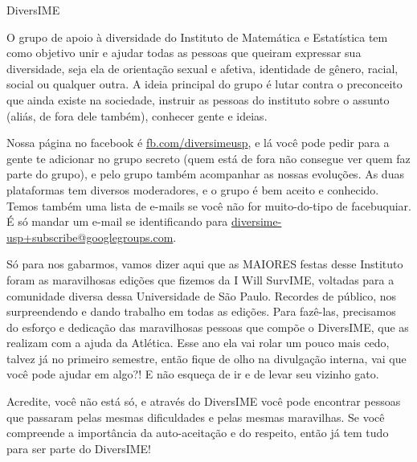 \begin{subsecao}{DiversIME}

O grupo de apoio à diversidade do Instituto de Matemática e Estatística tem como 
objetivo unir e ajudar todas as pessoas que queiram expressar sua diversidade, 
seja ela de orientação sexual e afetiva, identidade de gênero, racial, social ou 
qualquer outra. A ideia principal do grupo é lutar contra o preconceito que ainda 
existe na sociedade, instruir as pessoas do instituto sobre o assunto (aliás, 
de fora dele também), conhecer gente e ideias. 

Nossa página no facebook é \url{fb.com/diversimeusp}, e lá você pode pedir para 
a gente te adicionar no grupo secreto (quem está de fora não consegue ver quem 
faz parte do grupo), e pelo grupo também acompanhar as nossas evoluções. As duas 
plataformas tem diversos moderadores, e o grupo é bem aceito e conhecido. Temos também
uma lista de e-mails se você não for muito-do-tipo de facebuquiar. É só mandar 
um e-mail se identificando para \url{diversime-usp+subscribe@googlegroups.com}. 

Só para nos gabarmos, vamos dizer aqui que as MAIORES festas desse Instituto 
foram as maravilhosas edições que fizemos da I Will SurvIME, voltadas para a 
comunidade diversa dessa Universidade de São Paulo. Recordes de público, nos 
surpreendendo e dando trabalho em todas as edições. Para fazê-las, precisamos 
do esforço e dedicação das maravilhosas pessoas que compõe o DiversIME, que 
as realizam com a ajuda da Atlética. Esse ano ela vai rolar um pouco mais cedo, 
talvez já no primeiro semestre, então fique de olho na divulgação interna, vai 
que você pode ajudar em algo?! E não esqueça de ir e de levar seu vizinho gato.

Acredite, você não está só, e através do DiversIME você pode encontrar pessoas 
que passaram pelas mesmas dificuldades e pelas mesmas maravilhas. Se você compreende 
a importância da auto-aceitação e do respeito, então já tem tudo para ser parte 
do DiversIME!

\end{subsecao}
